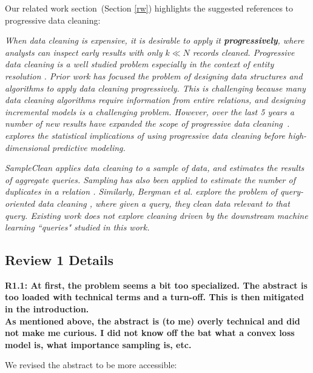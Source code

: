 \vspace{0.5em}
Our related work section~(Section \ref{rw}) highlights the suggested references to progressive data cleaning:

\emph{When data cleaning is expensive, it is desirable to apply it \textbf{progressively}, where analysts can inspect early results with only $k \ll N$ records cleaned.
Progressive data cleaning is a well studied problem especially in the context of entity resolution \cite{altowim2014progressive, whang2014incremental, papenbrock2015progressive, gruenheid2014incremental}.
Prior work has focused the problem of designing data structures and algorithms to apply data cleaning progressively.
This is challenging because many data cleaning algorithms require information from entire relations, and designing incremental models is a challenging problem.
However, over the last 5 years a number of new results have expanded the scope of progressive data cleaning~\cite{mayfield2010eracer, DBLP:journals/pvldb/YakoutENOI11, yakout2013don}.
\sys explores the statistical implications of using progressive data cleaning before high-dimensional predictive modeling.}

\vspace{0.5em}

\emph{SampleClean\cite{wang1999sample} applies data cleaning to a sample of data, and estimates the results of aggregate queries.
Sampling has also been applied to estimate the number of duplicates in a relation \cite{heise2014estimating}. 
Similarly, Bergman et al. explore the problem of query-oriented data cleaning \cite{DBLP:conf/sigmod/BergmanMNT15}, where given a query, they clean data relevant to that query. 
Existing work does not explore cleaning driven by the downstream machine learning ``queries" studied in this work.}

\subsection*{Review 1 Details} 

\noindent\textbf{R1.1: At first, the problem seems a bit too specialized. The abstract is too loaded with technical terms and a turn-off. This is then mitigated in the introduction. \\
As mentioned above, the abstract is (to me) overly technical and did not make me curious. I did not know off the bat what a convex loss model is, what importance sampling is, etc.}

\noindent We revised the abstract to be more accessible:

